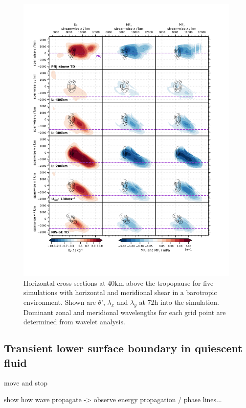 \begin{figure}[]
    \centering
    \includegraphics[width=0.99\textwidth]{figures_3D/waveletAna_fluxes_obs.png}
    \caption{Horizontal cross sections at 40km above the tropopause for five simulations with horizontal and meridional shear in a barotropic environment. Shown are $\theta$', $\lambda_x$ and $\lambda_y$ at 72h into the simulation. Dominant zonal and meridional wavelengths for each grid point are determined from wavelet analysis.}
    \label{fig:waveletAna_dudy}
\end{figure}


\subsection{Transient lower surface boundary in quiescent fluid}

move and stop 

show how wave propagate -> observe energy propagation / phase lines... 


